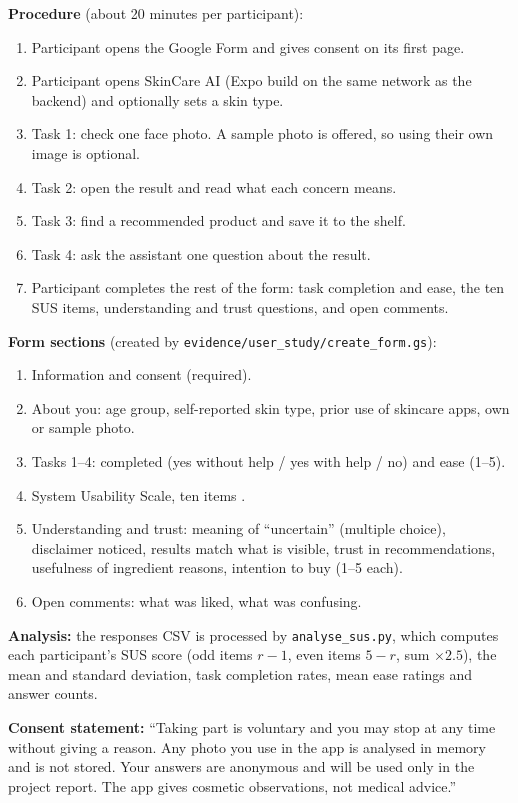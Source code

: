 \textbf{Procedure} (about 20 minutes per participant):
\begin{enumerate}
  \item Participant opens the Google Form and gives consent on its first page.
  \item Participant opens SkinCare AI (Expo build on the same network as the backend) and optionally sets a skin type.
  \item Task 1: check one face photo. A sample photo is offered, so using their own image is optional.
  \item Task 2: open the result and read what each concern means.
  \item Task 3: find a recommended product and save it to the shelf.
  \item Task 4: ask the assistant one question about the result.
  \item Participant completes the rest of the form: task completion and ease, the ten SUS items, understanding and trust questions, and open comments.
\end{enumerate}

\textbf{Form sections} (created by \texttt{evidence/user\_study/create\_form.gs}):
\begin{enumerate}[label=\arabic*.,itemsep=0pt]
  \item Information and consent (required).
  \item About you: age group, self-reported skin type, prior use of skincare apps, own or sample photo.
  \item Tasks 1--4: completed (yes without help / yes with help / no) and ease (1--5).
  \item System Usability Scale, ten items \citep{vlachogianni2022}.
  \item Understanding and trust: meaning of ``uncertain'' (multiple choice), disclaimer noticed, results match what is visible, trust in recommendations, usefulness of ingredient reasons, intention to buy (1--5 each).
  \item Open comments: what was liked, what was confusing.
\end{enumerate}

\textbf{Analysis:} the responses CSV is processed by \texttt{analyse\_sus.py}, which computes each participant's SUS score (odd items $r-1$, even items $5-r$, sum $\times 2.5$), the mean and standard deviation, task completion rates, mean ease ratings and answer counts.

\textbf{Consent statement:} ``Taking part is voluntary and you may stop at any time without giving a reason. Any photo you use in the app is analysed in memory and is not stored. Your answers are anonymous and will be used only in the project report. The app gives cosmetic observations, not medical advice.''

